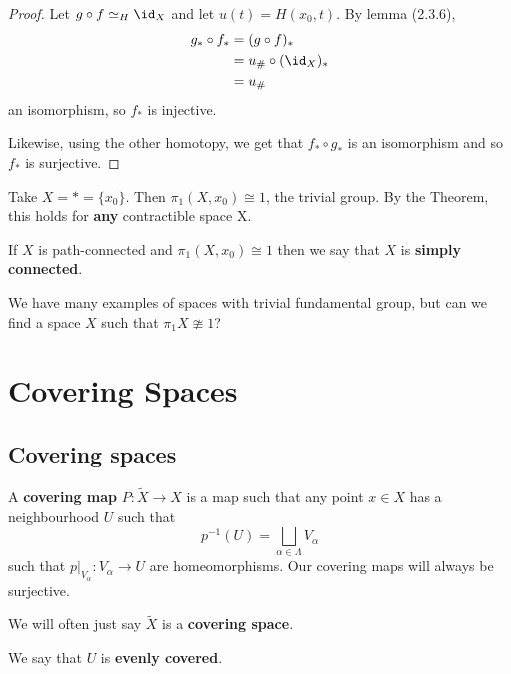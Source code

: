 \documentclass{article}
\numberwithin{nthm}{subsection}
\begin{document}
\begin{proof}
    Let $g \circ f \simeq_H \id_X$ and let $u(t) = H(x_0, t)$. By lemma (2.3.6),
    \begin{align*}
        g_* \circ f_* &= (g \circ f)_* \\
                      &= u_{\#} \circ (\id_X)_* \\
                      &= u_{\#}
    \end{align*}
    an isomorphism, so $f_*$ is injective.

    Likewise, using the other homotopy, we get that $f_* \circ g_*$ is an isomorphism and so $f_*$ is surjective.
\end{proof}

\begin{eg}
    Take $X = * = \{x_0\}$. Then $\pi_1(X, x_0) \cong 1$, the trivial group.  By the Theorem, this holds for \textbf{any} contractible space X.
\end{eg}

\begin{defi}
    If $X$ is path-connected and $\pi_1(X, x_0) \cong 1$ then we say that $X$ is \textbf{simply connected}.
\end{defi}

We have many examples of spaces with trivial fundamental group, but can we find a space $X$ such that $\pi_1 X \ncong 1$?

\clearpage
\section{Covering Spaces}

\subsection{Covering spaces}

\begin{defi}
    A \textbf{covering map} $P: \widetilde{X} \to X$ is a map such that any point $x \in X$ has a neighbourhood $U$ such that
    \begin{equation*}
        p^{-1}(U) = \bigsqcup_{\alpha \in \Lambda} V_\alpha
    \end{equation*}
    such that $p|_{V_\alpha}: V_\alpha \to U$ are homeomorphisms. Our covering maps will always be surjective.

    We will often just say $\widetilde{X}$ is a \textbf{covering space}.

    We say that $U$ is \textbf{evenly covered}.
\end{defi}
\end{document}
